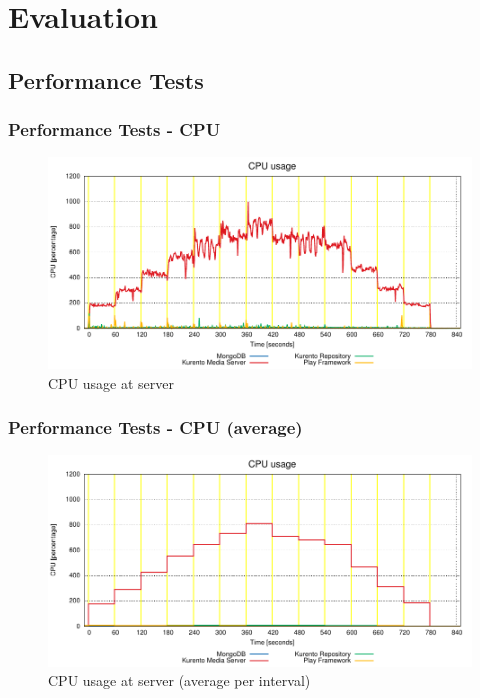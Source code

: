 \documentclass[compress]{beamer}
\begin{document}
\section{Evaluation}\label{arch}


\subsection{Performance Tests}

	\begin{frame}[c]
		\frametitle{Performance Tests - CPU}
		\begin{figure}[H]
			\includegraphics[width=\textwidth]{figures/cpu.pdf}
			\caption{CPU usage at server}
		\end{figure}
	\end{frame}
	\begin{frame}[c]
		\frametitle{Performance Tests - CPU (average)}
		\begin{figure}[H]
			\includegraphics[width=\textwidth]{figures/cpu_avg.pdf}
			\caption{CPU usage at server (average per interval)}
		\end{figure}
	\end{frame}
\end{document}
